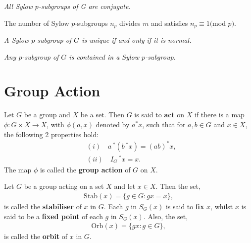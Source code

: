 \begin{theorem}
\textit{All Sylow $p$-subgroups of G are conjugate.} \\
\end{theorem}

\begin{theorem}
The number of Sylow $p$-subgroups $n_p$ divides $m$ and satisfies $n_p \equiv 1 ($mod $p)$. \\
\end{theorem}

\begin{corollary}
 \textit{A Sylow $p$-subgroup of $G$ is unique if and only if it is normal.} \\
\end{corollary}

\begin{corollary}
\textit{Any $p$-subgroup of $G$ is contained in a Sylow $p$-subgroup.} \\
\end{corollary}

\section{Group Action}

\begin{definition} 
    Let $G$ be a group and $X$ be a set. 
    Then $G$ is said to \textbf{act} on $X$ if there is a map $\phi : G \times X \rightarrow X$, with $\phi(a,x)$ denoted by $a^*x$, 
    such that for $a,b \in G$ and $x \in X$, the following 2 properties hold:
\begin{align*} &(i) \quad a\,^*(b\,^*x) = (ab)^*x,
\\  &(ii) \quad I_G\,^*x = x.
\end{align*}
The map $\phi$ is called the \textbf{group action} of $G$ on $X$.
\end{definition}

\begin{definition} 
    Let $G$ be a group acting on a set $X$ and let $x \in X$. Then the set,
\begin{align*} \textrm{Stab}(x) = \{ g \in G  :  gx = x \},
\end{align*}
is called the \textbf{stabiliser} of $x$ in $G$. Each $g$ in $S_G(x)$ is said to \textbf{fix} $x$, whilst $x$ is said to be a 
\textbf{fixed point} of each $g$ in $S_G(x)$. Also, the set,
\begin{align*} \textrm{Orb}(x) = \{ gx : g \in G \},
\end{align*}
is called the \textbf{orbit} of $x$ in $G$.  
\end{definition} 

